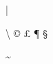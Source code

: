 \acute
\bar
\breve
\check
\ddot
\dot
\grave
\hat
\mathring
\tilde
\vec
\widehat
\widetilde

\gets
\mapsto
\to

\frac
\langle
\lceil
\left
\lfloor
\rangle
\rceil
\rfloor
\right

\alpha
\beta
\gamma
\delta
\epsilon
\varepsilon
\zeta
\eta
\theta
\vartheta
\iota
\kappa
\lambda
\mu
\nu
\xi
\pi
\varpi
\rho
\varrho
\sigma
\varsigma
\tau
\upsilon
\phi
\varphi
\chi
\psi
\omega
\Gamma
\Delta
\Theta
\Lambda
\Xi
\Pi
\Sigma
\Upsilon
\Phi
\Psi
\Omega

\bigcap
\bigcup
\bigodot
\bigoplus
\bigotimes
\bigsqcup
\biguplus
\bigvee
\bigwedge
\coprod
\int
\oint
\prod
\sum

\amalg
\ast
\bigcirc
\bigtriangledown
\bigtriangleup
\bullet
\cap
\cdot
\circ
\cup
\dagger
\ddagger
\diamond
\div
\lhd
\mp
\odot
\ominus
\oplus
\oslash
\otimes
\pm
\rhd
\setminus
\sqcap
\sqcup
\sqrt
\star
\times
\triangleleft
\triangleright
\unlhd
\unrhd
\uplus
\vee
\wedge
\wr

\aleph
\angle
\backslash
\blacksquare
\bot
\clubsuit
\copyright
\diamondsuit
\ell
\emptyset
\exists
\flat
\forall
\hbar
\heartsuit
\imath
\infty
\jmath
\mho
\nabla
\natural
\neg
\partial
\pounds
\prime
\sharp
\spadesuit
\surd
\top
\triangle
\wp
\Im
\P
\Re
\S

\approx
\asymp
\bowtie
\cong
\dashv
\doteq
\equiv
\frown
\ge
\gg
\gneq
\gneqq
\in
\le
\ll
\lneq
\lneqq
\lnsim
\mid
\models
\ncong
\neq
\ngeq
\ngtr
\ni
\nleq
\nless
\nmid
\not
\nparallel
\nsim
\parallel
\perp
\prec
\preceq
\propto
\sim
\simeq
\smile
\subset
\subseteq
\succ
\succeq
\supset
\supseteq
\vdash
